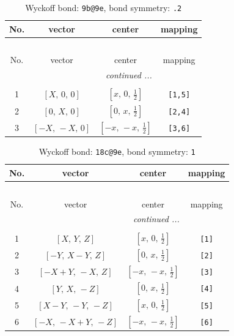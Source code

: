 \documentclass[fleqn,8pt]{jsarticle}
\begin{document}
\renewcommand{\arraystretch}{1.2}
\begin{longtable}{cccc}
\caption{Wyckoff bond: {\tt 9b@9e}, bond symmetry: {\tt .2}}
 \\
 \hline \hline
No. & vector & center & mapping \\ \hline \endfirsthead

\multicolumn{3}{l}{\tablename\ \thetable{}} \\
 \hline \hline
No. & vector & center & mapping \\ \hline \endhead

 \hline \hline
\multicolumn{3}{r}{\footnotesize\it continued ...} \\ \endfoot

 \hline \hline
\multicolumn{3}{r}{} \\ \endlastfoot

1 & $\left[ X,\, 0,\, 0 \right]$ & $\left[ x,\, 0,\, \frac{1}{2} \right]$ & {\tt [1,5]} \\ \hline
2 & $\left[ 0,\, X,\, 0 \right]$ & $\left[ 0,\, x,\, \frac{1}{2} \right]$ & {\tt [2,4]} \\ \hline
3 & $\left[ - X,\, - X,\, 0 \right]$ & $\left[ - x,\, - x,\, \frac{1}{2} \right]$ & {\tt [3,6]} \\
\end{longtable}
\renewcommand{\arraystretch}{1.2}
\begin{longtable}{cccc}
\caption{Wyckoff bond: {\tt 18c@9e}, bond symmetry: {\tt 1}}
 \\
 \hline \hline
No. & vector & center & mapping \\ \hline \endfirsthead

\multicolumn{3}{l}{\tablename\ \thetable{}} \\
 \hline \hline
No. & vector & center & mapping \\ \hline \endhead

 \hline \hline
\multicolumn{3}{r}{\footnotesize\it continued ...} \\ \endfoot

 \hline \hline
\multicolumn{3}{r}{} \\ \endlastfoot

1 & $\left[ X,\, Y,\, Z \right]$ & $\left[ x,\, 0,\, \frac{1}{2} \right]$ & {\tt [1]} \\ \hline
2 & $\left[ - Y,\, X - Y,\, Z \right]$ & $\left[ 0,\, x,\, \frac{1}{2} \right]$ & {\tt [2]} \\ \hline
3 & $\left[ - X + Y,\, - X,\, Z \right]$ & $\left[ - x,\, - x,\, \frac{1}{2} \right]$ & {\tt [3]} \\ \hline
4 & $\left[ Y,\, X,\, - Z \right]$ & $\left[ 0,\, x,\, \frac{1}{2} \right]$ & {\tt [4]} \\ \hline
5 & $\left[ X - Y,\, - Y,\, - Z \right]$ & $\left[ x,\, 0,\, \frac{1}{2} \right]$ & {\tt [5]} \\ \hline
6 & $\left[ - X,\, - X + Y,\, - Z \right]$ & $\left[ - x,\, - x,\, \frac{1}{2} \right]$ & {\tt [6]} \\
\end{longtable}
\end{document}
